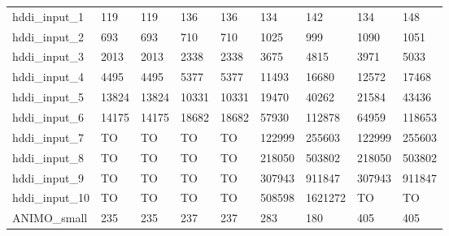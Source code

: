 \begin{table}
\begin{adjustbox}{max totalheight=\textheight}
\begin{tabular}{|l|llllllll|}
    hddi\_input\_1     & 119               & 119               & 136               & 136               & 134      & 142      & 134      & 148      \\
    hddi\_input\_2     & 693               & 693               & 710               & 710               & 1025     & 999      & 1090     & 1051     \\
    hddi\_input\_3     & 2013              & 2013              & 2338              & 2338              & 3675     & 4815     & 3971     & 5033     \\
    hddi\_input\_4     & 4495              & 4495              & 5377              & 5377              & 11493    & 16680    & 12572    & 17468    \\
    hddi\_input\_5     & 13824             & 13824             & 10331             & 10331             & 19470    & 40262    & 21584    & 43436    \\
    hddi\_input\_6     & 14175             & 14175             & 18682             & 18682             & 57930    & 112878   & 64959    & 118653   \\
    hddi\_input\_7     & TO                & TO                & TO                & TO                & 122999   & 255603   & 122999   & 255603   \\
    hddi\_input\_8     & TO                & TO                & TO                & TO                & 218050   & 503802   & 218050   & 503802   \\
    hddi\_input\_9     & TO                & TO                & TO                & TO                & 307943   & 911847   & 307943   & 911847   \\
    hddi\_input\_10    & TO                & TO                & TO                & TO                & 508598   & 1621272  & TO       & TO       \\ \hline
    ANIMO\_small       & 235               & 235               & 237               & 237               & 283      & 180      & 405      & 405      \\ \hline
    \end{tabular}
\end{adjustbox}
\end{table}



